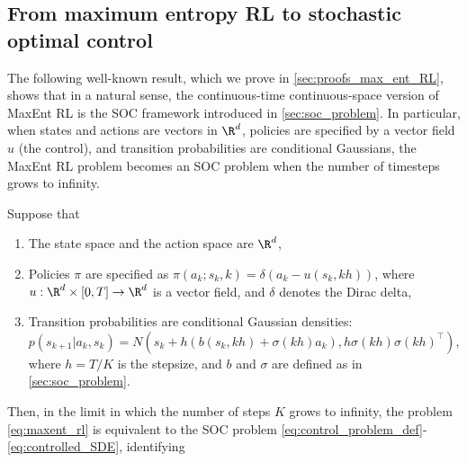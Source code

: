 \documentclass[]{fairmeta}
\begin{document}
\subsection{From maximum entropy RL to stochastic optimal control}
The following well-known result, which we prove in \autoref{sec:proofs_max_ent_RL}, shows that in a natural sense, the continuous-time continuous-space version of MaxEnt RL is the SOC
framework introduced in \autoref{sec:soc_problem}. In particular, when states and actions are vectors in $\R^d$, policies are specified by a vector field $u$ (the control), and transition probabilities are conditional Gaussians, the MaxEnt RL problem becomes an SOC problem when the number of timesteps grows to infinity. 

\begin{proposition} \label{prop:max_ent_stochastic_optimal_control}
    Suppose that 
    \begin{enumerate}[label=(\roman*)]
    \item The state space and the action space are 
    $\R^d$,
    \item Policies $\pi$ are specified as $\pi(a_k;s_k,k) = \delta(a_k - u(s_k,kh))$, where $u : \R^d \times [0,T] \to \R^d$ is a vector field, and $\delta$ denotes the Dirac delta, 
    \item 
    Transition probabilities are conditional Gaussian densities: $p(s_{k+1}|a_k,s_k) = N(s_k + h (b(s_k,kh) + \sigma(kh) a_k), h 
    \sigma(kh)\sigma(kh)^{\top})$, where $h  = T/K$ is the stepsize, and $b$ and $\sigma$ are defined as in \autoref{sec:soc_problem}. 
    \end{enumerate}
    Then, in the limit in which the number of steps $K$ grows to infinity, the problem \eqref{eq:maxent_rl} is equivalent to the SOC
    problem \eqref{eq:control_problem_def}-\eqref{eq:controlled_SDE}, identifying
    \begin{itemize}

\end{itemize}
\end{proposition}
\end{document}
